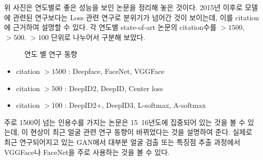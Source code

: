 \documentclass{oblivoir}
\begin{document}
위 사진은 연도별로 좋은 성능을 보인 논문을 정리해 놓은 것이다. 2015년 이후로 모델에 관련된 연구보다는 Loss 관련 연구로 분위기가 넘어간 것이 보이는데, 이를 citation에 근거하여 설명할 수 있다. 각 연도별 state-of-art 논문의 citation수를 $>1500$, $> 500$. $> 100$ 단위로 나누어서 구분해 보았다. 

\begin{figure}[h!]
\centering
\caption{연도 별 연구 동향 \cite{reference6}}
\end{figure}

\begin{itemize}
\item   citation $> 1500$ : Deepface, FaceNet, VGGFace
\item   citation $> 500$  : DeepID2, DeepID, Center loss
\item   citation $> 100$  : DeepID2+, DeepID3, L-softmax, A-softmax
\end{itemize}

주로 1500이 넘는 인용수를 가지는 논문은 15~16년도에 집중되어 있는 것을 볼 수 있는데, 이 현상이 최근 얼굴 관련 연구 동향이 바뀌었다는 것을 설명하여 준다. 실제로 최근 연구되어지고 있는 GAN에서 대부분 얼굴 검출 또는 특징점 추출 과정에서 VGGFace나 FaceNet을 주로 사용하는 것을 볼 수 있다. 
\end{document}
